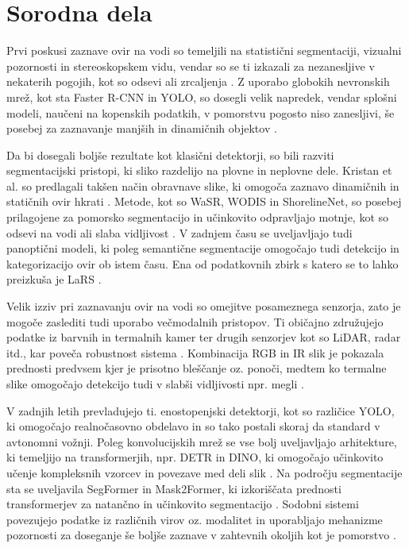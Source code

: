 \documentclass[10pt,twocolumn,letterpaper]{article}
\begin{document}
\section{Sorodna dela}

Prvi poskusi zaznave ovir na vodi so temeljili na statistični segmentaciji, vizualni pozornosti in stereoskopskem vidu, vendar so se ti izkazali za nezanesljive v nekaterih pogojih, kot so odsevi ali zrcaljenja \cite{Cane2016CVPRW, Prasad2019Background, Wang2013ROBIO, Cane2019AVSS}. Z uporabo globokih nevronskih mrež, kot sta Faster R-CNN in YOLO, so dosegli velik napredek, vendar splošni modeli, naučeni na kopenskih podatkih, v pomorstvu pogosto niso zanesljivi, še posebej za zaznavanje manjših in dinamičnih objektov \cite{Bochkovskiy2020YOLOv4, Steccanella2020RAS, Cane2019AVSS}.

Da bi dosegali boljše rezultate kot klasični detektorji, so bili razviti segmentacijski pristopi, ki sliko razdelijo na plovne in neplovne dele. Kristan et al. so predlagali takšen način obravnave slike, ki omogoča zaznavo dinamičnih in statičnih ovir hkrati \cite{Kristan2016Cyber}. Metode, kot so WaSR, WODIS in ShorelineNet, so posebej prilagojene za pomorsko segmentacijo in učinkovito odpravljajo motnje, kot so odsevi na vodi ali slaba vidljivost \cite{Bovcon2021Tcyb, Chen2021TIM, Yao2021IROS}. V zadnjem času se uveljavljajo tudi panoptični modeli, ki poleg semantične segmentacije omogočajo tudi detekcijo in kategorizacijo ovir ob istem času. Ena od podatkovnih zbirk s katero se to lahko preizkuša je LaRS \cite{Zust2023ICCV}.

Velik izziv pri zaznavanju ovir na vodi so omejitve posameznega senzorja, zato je mogoče zaslediti tudi uporabo večmodalnih pristopov. Ti običajno združujejo podatke iz barvnih in termalnih kamer ter drugih senzorjev kot so LiDAR, radar itd., kar poveča robustnost sistema \cite{BenShoushan2023RS}. Kombinacija RGB in IR slik je pokazala prednosti predvsem kjer je prisotno bleščanje oz. ponoči, medtem ko termalne slike omogočajo detekcijo tudi v slabši vidljivosti npr. megli \cite{BenShoushan2023RS, Kristo2020Access}.

V zadnjih letih prevladujejo ti. enostopenjski detektorji, kot so različice YOLO, ki omogočajo realnočasovno obdelavo in so tako postali skoraj da standard v avtonomni vožnji\cite{Bochkovskiy2020YOLOv4}. Poleg konvolucijskih mrež se vse bolj uveljavljajo arhitekture, ki temeljijo na transformerjih, npr. DETR in DINO, ki omogočajo učinkovito učenje kompleksnih vzorcev in povezave med deli slik \cite{Carion2020DETR, Zhang2023DINO}. Na področju segmentacije sta se uveljavila SegFormer in Mask2Former, ki izkoriščata prednosti transformerjev za natančno in učinkovito segmentacijo \cite{Xie2021SegFormer, Cheng2022Mask2Former}. Sodobni sistemi povezujejo podatke iz različnih virov oz. modalitet in uporabljajo  mehanizme pozornosti za doseganje še boljše zaznave v zahtevnih okoljih kot je pomorstvo \cite{Cheng2021RAL}.
\end{document}

